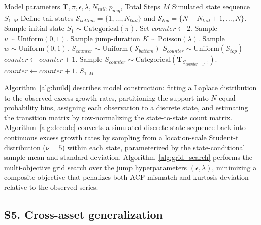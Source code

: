 \begin{algorithm}[tp]
\caption{Hybrid jump-diffusion simulation with persistent volatility}
\label{alg:sim}
\small
\begin{algorithmic}[1]
\REQUIRE Model parameters $\mathbf{T}, \bar{\pi}, \epsilon, \lambda, N_{tail}, p_{neg}$, Total Steps $M$
\ENSURE Simulated state sequence $S_{1:M}$
\STATE Define tail-states $\mathcal{S}_{bottom} = \{1, \dots, N_{tail}\}$ and $\mathcal{S}_{top} = \{N-N_{tail}+1, \dots, N\}$.
\STATE Sample initial state $S_1 \sim \text{Categorical}(\bar{\pi})$.
\STATE Set $counter \leftarrow 2$.
    \STATE Sample $u \sim \text{Uniform}(0, 1)$.
        \STATE Sample jump-duration $K \sim \text{Poisson}(\lambda)$.
            \STATE Sample $w \sim \text{Uniform}(0, 1)$.
                \STATE $S_{counter} \sim \text{Uniform}(\mathcal{S}_{bottom})$ 
            \ELSE
                \STATE $S_{counter} \sim \text{Uniform}(\mathcal{S}_{top})$
            \ENDIF
            \STATE $counter \leftarrow counter + 1$.
        \ENDFOR
    \ELSE
        \STATE Sample $S_{counter} \sim \text{Categorical}(\mathbf{T}_{S_{counter-1}, :})$.
        \STATE $counter \leftarrow counter + 1$.
    \ENDIF
\ENDWHILE
\RETURN $S_{1:M}$
\end{algorithmic}
\end{algorithm}
Algorithm~\ref{alg:build} describes model construction: fitting a Laplace distribution to the observed excess growth rates, partitioning the support into $N$ equal-probability bins, assigning each observation to a discrete state, and estimating the transition matrix by row-normalizing the state-to-state count matrix.
Algorithm~\ref{alg:decode} converts a simulated discrete state sequence back into continuous excess growth rates by sampling from a location-scale Student-t distribution ($\nu=5$) within each state, parameterized by the state-conditional sample mean and standard deviation.
Algorithm~\ref{alg:grid_search} performs the multi-objective grid search over the jump hyperparameters $(\epsilon, \lambda)$, minimizing a composite objective that penalizes both ACF mismatch and kurtosis deviation relative to the observed series.

\subsection*{S5. Cross-asset generalization}

